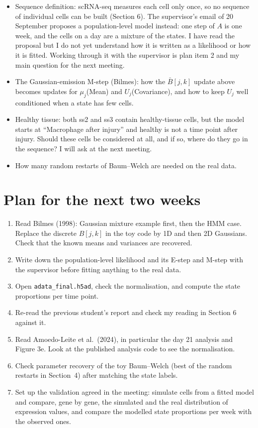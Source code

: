 \documentclass[10pt,a4paper]{article}
\begin{document}
\begin{itemize}
  \item Sequence definition: scRNA-seq measures each cell only once, so no sequence of individual cells can be built (Section 6). The supervisor's email of 20 September proposes a population-level model instead: one step of $A$ is one week, and the cells on a day are a mixture of the states. I have read the proposal but I do not yet understand how it is written as a likelihood or how it is fitted. Working through it with the supervisor is plan item 2 and my main question for the next meeting.
  \item The Gaussian-emission M-step (Bilmes): how the $\bar{B}[j,k]$ update above becomes updates for $\mu_j$(Mean) and $U_j$(Covariance), and how to keep $U_j$ well conditioned when a state has few cells.
  \item Healthy tissue: both ss2 and ss3 contain healthy-tissue cells, but the model starts at ``Macrophage after injury'' and healthy is not a time point after injury. Should these cells be considered at all, and if so, where do they go in the sequence? I will ask at the next meeting.
  \item How many random restarts of Baum--Welch are needed on the real data.
\end{itemize}

\section{Plan for the next two weeks}

\begin{enumerate}
  \item Read Bilmes (1998): Gaussian mixture example first, then the HMM case. Replace the discrete $B[j,k]$ in the toy code by 1D and then 2D Gaussians. Check that the known means and variances are recovered.
  \item Write down the population-level likelihood and its E-step and M-step with the supervisor before fitting anything to the real data.
  \item Open \texttt{adata\_final.h5ad}, check the normalisation, and compute the state proportions per time point.
  \item Re-read the previous student's report and check my reading in Section 6 against it.
  \item Read Amoedo-Leite et al.\ (2024), in particular the day 21 analysis and Figure 3e. Look at the published analysis code to see the normalisation.
  \item Check parameter recovery of the toy Baum--Welch (best of the random restarts in Section~4) after matching the state labels.
  \item Set up the validation agreed in the meeting: simulate cells from a fitted model and compare, gene by gene, the simulated and the real distribution of expression values, and compare the modelled state proportions per week with the observed ones.
\end{enumerate}
\end{document}

